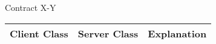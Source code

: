 \begin{subsubsection}{Contract X-Y}
	\begin{tabular}{l l l }
	  Client Class & Server Class & Explanation\\ \hline
	\end{tabular}
\end{subsubsection}